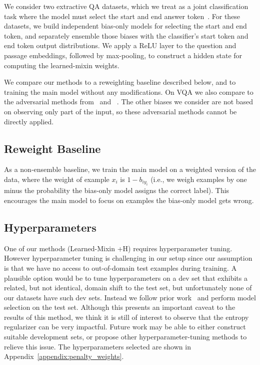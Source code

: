 \documentclass[11pt,a4paper]{article}
\begin{document}
We consider two extractive QA datasets, which we treat as a joint classification task where the model must select the start and end answer token~\cite{wang2016machine}. 
For these datasets, we build independent bias-only models for selecting the start and end token, and separately ensemble those biases with the classifier's start token and end token output distributions.  
We apply a ReLU layer to the question and passage embeddings, followed by max-pooling, to construct a hidden state for computing the learned-mixin weights.

We compare our methods to a reweighting baseline described below, and to training the main model without any modifications. On VQA we also compare to the adversarial methods from~\citet{ramakrishnan2018overcoming} and ~\citet{grand2019adversarial}. The other biases we consider are not based on observing only part of the input, so these adversarial methods cannot be directly applied.

\subsection{Reweight Baseline}
As a non-ensemble baseline, we train the main model on a weighted version of the data, where the weight of example $x_i$ is $1 - b_{iy_i}$ (i.e., we weigh examples by one minus the probability the bias-only model assigns the correct label). 
This encourages the main model to focus on examples the bias-only model gets wrong.
    
\subsection{Hyperparameters}
One of our methods (Learned-Mixin +H) requires hyperparameter tuning. However hyperparameter tuning is challenging in our setup since our assumption is that we have no access to out-of-domain test examples during training. 
A plausible option would be to tune hyperparameters on a dev set that exhibits a related, but not identical, domain shift to the test set, but unfortunately none of our datasets have such dev sets. Instead we follow prior work~\cite{grand2019adversarial,ramakrishnan2018overcoming} and perform model selection on the test set. Although this presents an important caveat to the results of this method, we think it is still of interest to observe that the entropy regularizer can be very impactful. Future work may be able to either construct suitable development sets, or propose other hyperparameter-tuning methods to relieve this issue. The hyperparameters selected are shown in Appendix~\ref{appendix:penalty_weights}.
\end{document}
